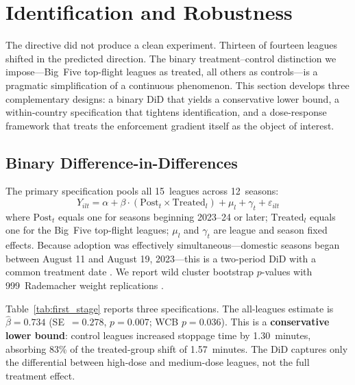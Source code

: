 
\section{Identification and Robustness}
\label{sec:strategy}

The directive did not produce a clean experiment. Thirteen of fourteen
leagues shifted in the predicted direction. The binary
treatment--control distinction we impose---Big~Five top-flight leagues
as treated, all others as controls---is a pragmatic simplification of a
continuous phenomenon. This section develops three complementary
designs: a binary DiD that yields a conservative lower bound, a
within-country specification that tightens identification, and a
dose-response framework that treats the enforcement gradient itself as
the object of interest.


\subsection{Binary Difference-in-Differences}
\label{subsec:binary_did}

The primary specification pools all 15~leagues across 12~seasons:
%
\begin{equation}\label{eq:did}
  Y_{ilt} = \alpha + \beta \cdot (\text{Post}_t \times \text{Treated}_l)
  + \mu_l + \gamma_t + \varepsilon_{ilt}
\end{equation}
%
where $\text{Post}_t$ equals one for seasons beginning 2023--24 or
later; $\text{Treated}_l$ equals one for the Big~Five top-flight
leagues; $\mu_l$ and $\gamma_t$ are league and season fixed effects.
Because adoption was effectively simultaneous---domestic seasons began
between August 11 and August 19, 2023---this is a two-period DiD with
a common treatment date \citep{goodmanbacon2021difference,
callaway2021difference}. We report wild cluster bootstrap $p$-values
with 999~Rademacher weight replications \citep{cameron2008bootstrap}.



Table~\ref{tab:first_stage} reports three specifications. The
all-leagues estimate is $\hat{\beta} = 0.734$ (SE~$= 0.278$,
$p = 0.007$; WCB $p = 0.036$). This is a \textbf{conservative lower
bound}: control leagues increased stoppage time by 1.30~minutes,
absorbing 83\% of the treated-group shift of 1.57~minutes. The DiD
captures only the differential between high-dose and medium-dose
leagues, not the full treatment effect.

